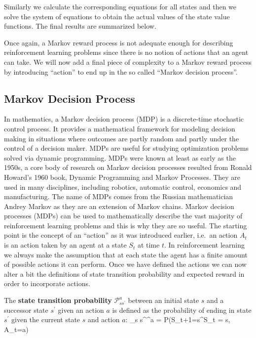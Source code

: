 \vspace{-10pt}

Similarly we calculate the corresponding equations for all states and then we solve the system of equations to obtain
the actual values of the state value functions. The final results are summarized below.


Once again, a Markov reward process is not adequate enough for describing reinforcement learning problems since there
is no notion of actions that an agent can take. We will now add a final piece of complexity to a Markov reward
process by introducing ``action'' to end up in the so called ``Markov decision process''.

\subsection{Markov Decision Process}

In mathematics, a Markov decision process (MDP) is a discrete-time stochastic control process. It provides a
mathematical framework for modeling decision making in situations where outcomes are partly random and partly under
the control of a decision maker. MDPs are useful for studying optimization problems solved via dynamic programming.
MDPs were known at least as early as the 1950s, a core body of research on Markov decision processes resulted from
Ronald Howard's 1960 book, Dynamic Programming and Markov Processes. They are used in many disciplines, including
robotics, automatic control, economics and manufacturing. The name of MDPs comes from the Russian mathematician
Andrey Markov as they are an extension of Markov chains. \v

Markov decision processes (MDPs) can be used to mathematically describe the vast majority of reinforcement learning
problems and this is why they are so useful. The starting point is the concept of an ``action'' as it was introduced
earlier, i.e.\ an action $A_t$ is an action taken by an agent at a state $S_t$ at time $t$. In reinforcement learning
we always make the assumption that at each state the agent has a finite amount of possible actions it can perform.
Once we have defined the actions we can now alter a bit the definitions of state transition probability and expected
reward in order to incorporate actions.

 The \textbf{state transition probability}
$\mathcal{P}_{s s^\prime}^{a}$ between an initial state $s$ and a successor state $s^\prime$ given an action $a$ is
defined as the probability of ending in state $s^\prime$ given the current state $s$ and action $a$:
\bse
{}_{s s^\prime}^{a} = P(S_{t+1}=s^\prime \mid S_{t} = s, A_t=a)
\ese
\ed

